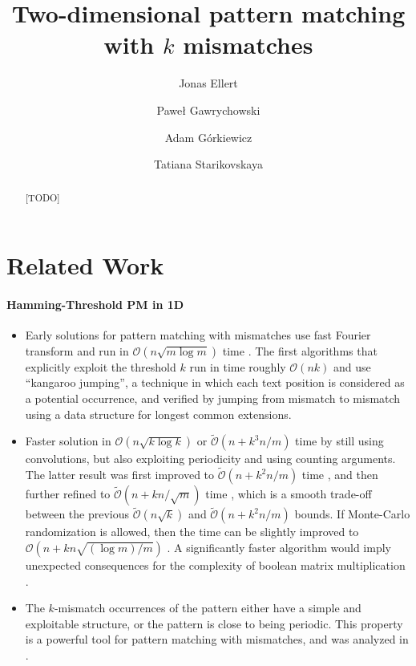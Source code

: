 \documentclass[11pt]{article}
\title{Two-dimensional pattern matching with $k$ mismatches}
\author[1]{Jonas Ellert}
\author[2]{Paweł Gawrychowski}
\author[3]{Adam Górkiewicz}
\author[4]{Tatiana Starikovskaya}
\affil[1]{?}
\affil[2]{?}
\affil[3]{?}
\affil[4]{?}
\renewcommand{\O}{\mathcal{O}}
\newcommand{\tO}{\tilde{\mathcal{O}}}
\theoremstyle{plain}
\theoremstyle{definition}
\theoremstyle{remark}
\begin{document}
\date{}
\maketitle

\begin{abstract}
	[TODO]
\end{abstract}


\section{Related Work}

\paragraph{Hamming-Threshold PM in 1D}

\begin{itemize}
	\item Early solutions for pattern matching with mismatches use fast Fourier transform and run in $\O(n \sqrt{m \log m})$ time \cite{Abrahamson1987}. The first algorithms that explicitly exploit the threshold $k$ run in time roughly $\O(nk)$ \cite{Landau1986,Galil1986} and use ``kangaroo jumping'', a technique in which each text position is considered as a potential occurrence, and verified by jumping from mismatch to mismatch using a data structure for longest common extensions.
	\item Faster solution in $\O(n\sqrt{k \log k})$ or $\tO(n + k^3n/m)$ time \cite{Amir2004} by still using convolutions, but also exploiting periodicity and using counting arguments. The latter result was first improved to $\tO(n + k^2n/m)$ time \cite{Clifford2016a}, and then further refined to $\tO(n + kn/\sqrt{m})$ time \cite{Gawrychowski2018}, which is a smooth trade-off between the previous $\tO(n\sqrt{k})$ and $\tO(n + k^2n/m)$ bounds. If Monte-Carlo randomization is allowed, then the time can be slightly improved to $\O(n + kn\sqrt{(\log m) / m})$ \cite{Chan2020}. A significantly faster algorithm would imply unexpected consequences for the complexity of boolean matrix multiplication \cite{Gawrychowski2018}.
	\item The $k$-mismatch occurrences of the pattern either have a simple and exploitable structure, or the pattern is close to being periodic. This property is a powerful tool for pattern matching with mismatches, and was analyzed in \cite{Bringmann2019,Charalampopoulos2020a}.
\end{itemize}
\end{document}
